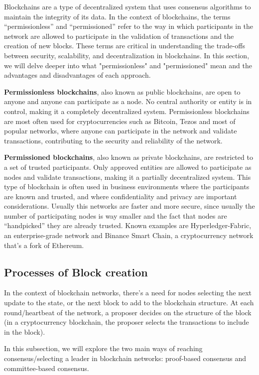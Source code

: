 Blockchains are a type of decentralized system that uses consensus algorithms to maintain the integrity of its data. In the context of blockchains, the terms ``permissionless'' and ``permissioned'' refer to the way in which participants in the network are allowed to participate in the validation of transactions and the creation of new blocks.
These terms are critical in understanding the trade-offs between security, scalability, and decentralization in blockchains. In this section, we will delve deeper into what "permissionless" and "permissioned" mean and the advantages and disadvantages of each approach.

\textbf{Permissionless blockchains}, also known as public blockchains, are open to anyone and anyone can participate as a node. No central authority or entity is in control, making it a completely decentralized system. Permissionless blockchains are most often used for cryptocurrencies such as Bitcoin, Tezos and most of popular networks, where anyone can participate in the network and validate transactions, contributing to the security and reliability of the network.

\textbf{Permissioned blockchains}, also known as private blockchains, are restricted to a set of trusted participants. Only approved entities are allowed to participate as nodes and validate transactions, making it a partially decentralized system. This type of blockchain is often used in business environments where the participants are known and trusted, and where confidentiality and privacy are important considerations. Usually this networks are faster and more secure, since usually the number of participating nodes is way smaller and the fact that nodes are ``handpicked'' they are already trusted.
Known examples are Hyperledger-Fabric, an enterprise-grade network and Binance Smart Chain, a cryptocurrency network that's a fork of Ethereum.

\subsection*{Processes of Block creation}
In the context of blockchain networks, there's a need for nodes selecting the next update to the state, or the next block to add to the blockchain structure. At each round/heartbeat of the network, a proposer decides on the structure of the block (in a cryptocurrency blockchain, the proposer selects the transactions to include in the block).

In this subsection, we will explore the two main ways of reaching consensus/selecting a leader in blockchain networks: proof-based consensus and committee-based consensus.


